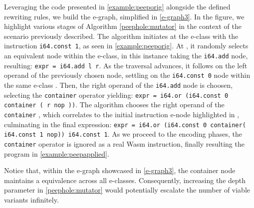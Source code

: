 Leveraging the code presented in \autoref{example:peeporig} alongside the defined rewriting rules, we build the e-graph, simplified in \autoref{e-graph3}.
In the figure, we highlight various stages of Algorithm \ref{peephole:mutator} in the context of the scenario previously described. 
The algorithm initiates at the e-class with the instruction \texttt{i64.const 1}, as seen in \autoref{example:peeporig}.
At , it randomly selects an equivalent node within the e-class, in this instance taking the \texttt{i64.add} node, resulting: {\texttt{expr = i64.add l r}}.
As the traversal advances, it follows on the left operand of the previously chosen node, settling on the \texttt{i64.const 0} node within the same e-class .
Then, the right operand of the \texttt{i64.add} node is choosen, selecting the \texttt{container}  operator yielding:
{\texttt{expr = i64.or (i64.const 0 container ( r nop ))}}.
The algorithm chooses the right operand of the \texttt{container} , which correlates to the initial instruction e-node highlighted in , culminating in the final expression:
{\texttt{expr = i64.or (i64.const 0 container( i64.const 1 nop))\ i64.const 1}}.
As we proceed to the encoding phases, the \texttt{container} operator is ignored as a real Wasm instruction, finally resulting the program in \autoref{example:peepapplied}.

Notice that, within the e-graph showcased in \autoref{e-graph3}, the container node maintains a equivalence across all e-classes. 
Consequently, increasing the depth parameter in \autoref{peephole:mutator} would potentially escalate the number of viable variants infinitely.

